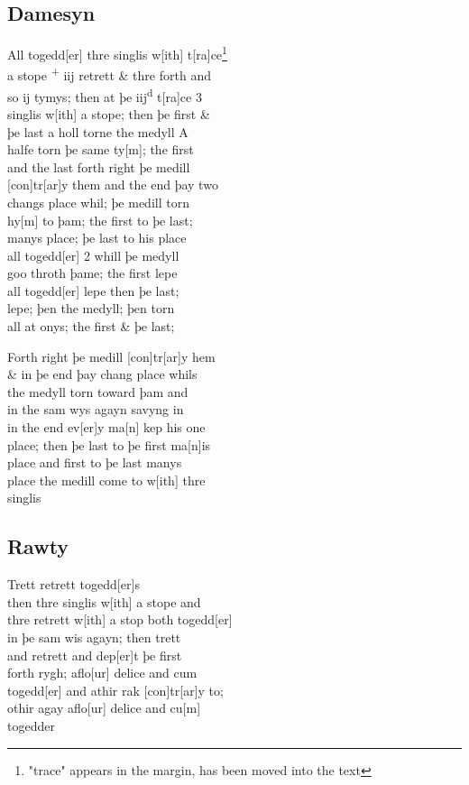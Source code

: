 \documentclass[12pt,letter]{article} %
\newcommand{\srcpg}[1]{
    \noindent{
        \color{Gray}{\rule[0.5ex]{\linewidth}{1pt}~#1} 
    
    }
}
\begin{document}
\subsection{Damesyn}
All togedd{[}er{]} thre singlis w{[}ith{]} {t{[}ra{]}ce}\footnote{"trace" appears in the margin, has been moved into the text}\\
a stope \textsuperscript{+} iij retrett \& thre forth and\\
so ij tymys; then at þe iij\textsuperscript{d} t{[}ra{]}ce 3\\
singlis w{[}ith{]} a stope; then þe first \&\\
þe last a holl torne the medyll A\\
halfe torn þe same ty{[}m{]}; the first\\
and the last forth right þe medill\\
{[}con{]}tr{[}ar{]}y them and the end þay two\\
changs place whil; þe medill torn\\
hy{[}m{]} to þam; the first to þe last;\\
manys place; þe last to his place\\
all togedd{[}er{]} 2 whill þe medyll\\
goo throth þame; the first lepe\\
all togedd{[}er{]} lepe then þe last;\\
lepe; þen the medyll; þen torn\\
all at onys; the first \& þe last; 
\srcpg{69} 
Forth right þe medill {[}con{]}tr{[}ar{]}y hem\\
\& in þe end þay chang place whils\\
the medyll torn toward þam and\\
in the sam wys agayn savyng in\\
in the end ev{[}er{]}y ma{[}n{]} kep his one\\
place; then þe last to þe first ma{[}n{]}is\\
place and first to þe last manys\\
place the medill come to w{[}ith{]} thre\\
singlis

\subsection{Rawty}
Trett retrett togedd{[}er{]}s\\
then thre singlis w{[}ith{]} a stope and\\
thre retrett w{[}ith{]} a stop both togedd{[}er{]}\\
in þe sam wis agayn; then trett\\
and retrett and dep{[}er{]}t þe first\\
forth rygh; aflo{[}ur{]} delice and cum\\
togedd{[}er{]} and athir rak {[}con{]}tr{[}ar{]}y to;\\
othir agay aflo{[}ur{]} delice and cu{[}m{]}\\
togedder
\end{document}
